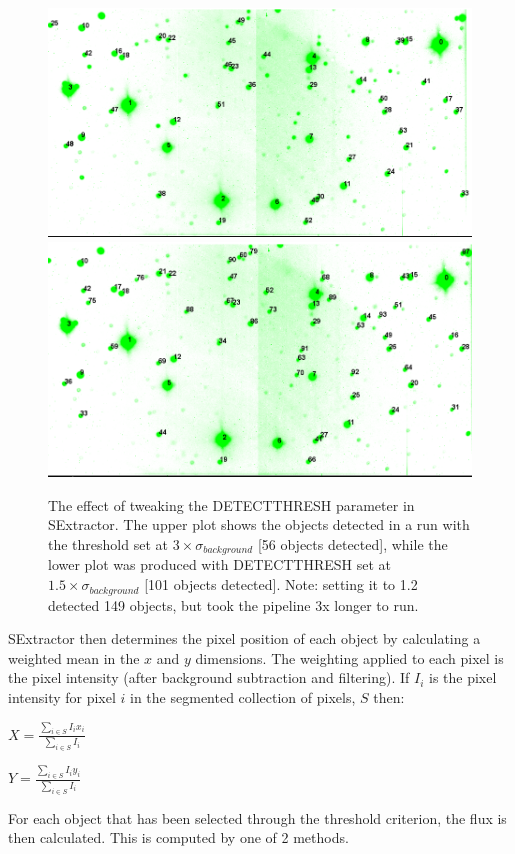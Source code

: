 \begin{figure}
  \centering
  \includegraphics[width=.8\linewidth]{images/2012-09-03_g_default.png}
  \includegraphics[width=.8\linewidth]{images/2012-09-03_g_15sigma.png}
  \caption{The effect of tweaking the DETECT\textunderscore THRESH parameter in SExtractor. The upper plot shows the objects detected in a run with the threshold set at $ 3\times \sigma_{background}$ [56 objects detected], while the lower plot was produced with DETECT\textunderscore THRESH set at $ 1.5\times \sigma_{background}$  [101 objects detected]. Note: setting it to 1.2 detected 149 objects, but took the pipeline 3x longer to run. }
\label{fig:tweakingthreshold}
\end{figure}

SExtractor then determines the pixel position of each object by calculating a weighted mean in the $x$ and $y$ dimensions. The weighting applied to each pixel is the pixel intensity (after background subtraction and filtering). If $I_{i}$ is the pixel intensity for pixel $i$ in the segmented collection of pixels, $S$ then:

$ X = \frac{\sum\limits_{i \in S} I_{i}x_{i}}{\sum\limits_{i \in S} I_i}$

$ Y = \frac{\sum\limits_{i \in S} I_{i}y_{i}}{\sum\limits_{i \in S} I_i}$

For each object that has been selected through the threshold criterion, the flux is then calculated. This is computed by one of 2 methods. 

